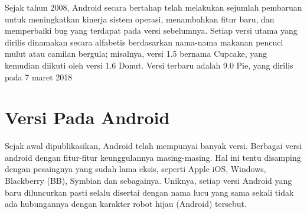 Sejak tahun 2008, Android secara bertahap telah melakukan sejumlah pembaruan untuk meningkatkan kinerja sistem operasi, menambahkan fitur baru, dan memperbaiki bug yang terdapat pada versi sebelumnya. Setiap versi utama yang dirilis dinamakan secara alfabetis berdasarkan nama-nama makanan pencuci mulut atau camilan bergula; misalnya, versi 1.5 bernama Cupcake, yang kemudian diikuti oleh versi 1.6 Donut. Versi terbaru adalah 9.0 Pie, yang dirilis pada 7 maret 2018

\section{Versi Pada Android}
Sejak awal dipublikasikan, Android telah mempunyai banyak versi. Berbagai versi android dengan fitur-fitur keunggulannya masing-masing. Hal ini tentu disamping dengan pesaingnya yang sudah lama eksis, seperti Apple iOS, Windows, Blackberry (BB), Symbian dan sebagainya. Uniknya, setiap versi Android yang baru diluncurkan pasti selalu disertai dengan nama lucu yang sama sekali tidak ada hubungannya dengan karakter robot hijau (Android) tersebut.

